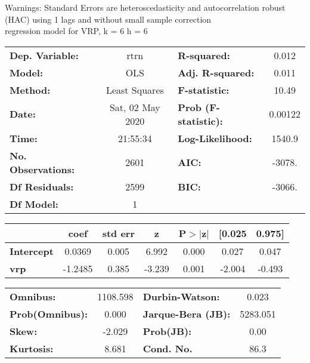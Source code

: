 Warnings: \newline
 [1] Standard Errors are heteroscedasticity and autocorrelation robust (HAC) using 1 lags and without small sample correction\\ 

regression model for VRP, k = 6 h = 6\begin{center}
\begin{tabular}{lclc}
\toprule
\textbf{Dep. Variable:}    &       rtrn       & \textbf{  R-squared:         } &     0.012   \\
\textbf{Model:}            &       OLS        & \textbf{  Adj. R-squared:    } &     0.011   \\
\textbf{Method:}           &  Least Squares   & \textbf{  F-statistic:       } &     10.49   \\
\textbf{Date:}             & Sat, 02 May 2020 & \textbf{  Prob (F-statistic):} &  0.00122    \\
\textbf{Time:}             &     21:55:34     & \textbf{  Log-Likelihood:    } &    1540.9   \\
\textbf{No. Observations:} &        2601      & \textbf{  AIC:               } &    -3078.   \\
\textbf{Df Residuals:}     &        2599      & \textbf{  BIC:               } &    -3066.   \\
\textbf{Df Model:}         &           1      & \textbf{                     } &             \\
\bottomrule
\end{tabular}
\begin{tabular}{lcccccc}
                   & \textbf{coef} & \textbf{std err} & \textbf{z} & \textbf{P$> |$z$|$} & \textbf{[0.025} & \textbf{0.975]}  \\
\midrule
\textbf{Intercept} &       0.0369  &        0.005     &     6.992  &         0.000        &        0.027    &        0.047     \\
\textbf{vrp}       &      -1.2485  &        0.385     &    -3.239  &         0.001        &       -2.004    &       -0.493     \\
\bottomrule
\end{tabular}
\begin{tabular}{lclc}
\textbf{Omnibus:}       & 1108.598 & \textbf{  Durbin-Watson:     } &    0.023  \\
\textbf{Prob(Omnibus):} &   0.000  & \textbf{  Jarque-Bera (JB):  } & 5283.051  \\
\textbf{Skew:}          &  -2.029  & \textbf{  Prob(JB):          } &     0.00  \\
\textbf{Kurtosis:}      &   8.681  & \textbf{  Cond. No.          } &     86.3  \\
\bottomrule
\end{tabular}
\end{center}


